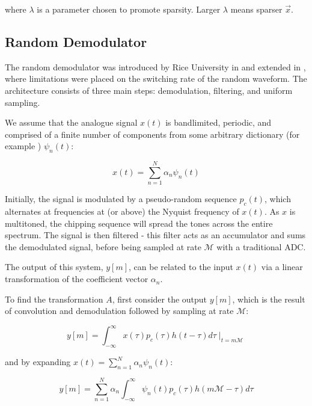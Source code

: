 where \(\lambda\) is a parameter chosen to promote sparsity. Larger \(\lambda\) means sparser \(\vec{x}\).

\subsection{Random Demodulator}
The random demodulator was introduced by Rice University in \cite{kirolos2006analog} and extended in \cite{ harms2013constrained}, where limitations were placed on the switching rate of the random waveform. The architecture consists of three main steps: demodulation, filtering, and uniform sampling. 

We assume that the analogue signal \(x\left(t\right)\) is bandlimited, periodic, and comprised of a finite number of components from some arbitrary dictionary (for example ) \(\psi_n\left(t\right)\):

\begin{equation}
x\left(t\right) = \sum_{n=1}^N \alpha_n \psi_n\left(t\right)
\end{equation}

Initially, the signal is modulated by a pseudo-random sequence \(p_c\left(t\right)\), which alternates at frequencies at (or above) the Nyquist frequency of \(x\left(t\right)\). As \(x\) is multitoned, the chipping sequence will spread the tones across the entire spectrum. The signal is then filtered - this filter acts as an accumulator and sums the demodulated signal, before being sampled at rate \(\mathcal{M}\) with a traditional ADC.

The output of this system, \(y\left[m\right]\), can be related to the input \(x\left(t\right)\) via a linear transformation of the coefficient vector \(\alpha_n\). 

To find the transformation \(A\), first consider the output \(y\left[m\right]\), which is the result of convolution and demodulation followed by sampling at rate \(\mathcal{M}\):

\begin{equation}
y\left[m\right] = \int_{-\infty}^{\infty} x\left(\tau\right)p_c\left(\tau\right)h\left(t - \tau\right)d\tau\mid_{t = m\mathcal{M}}
\end{equation}

and by expanding \(x\left(t\right) = \sum_{n=1}^N \alpha_n \psi_n\left(t\right)\):

\begin{equation}
y\left[m\right] =  \sum_{n=1}^N \alpha_n \int_{-\infty}^{\infty} \psi_n\left(t\right)p_c\left(\tau\right)h\left(m\mathcal{M} - \tau\right)d\tau
\end{equation}

